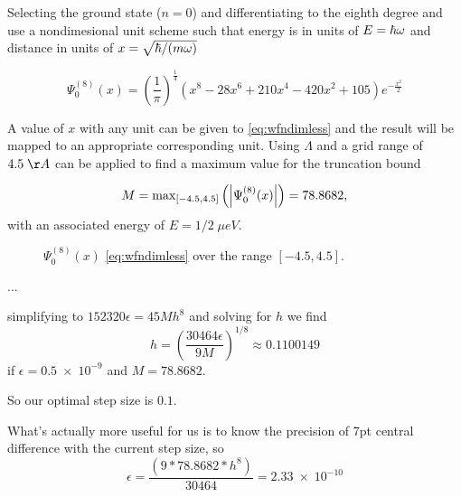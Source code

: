Selecting the ground state ($n=0$) and differentiating to the eighth degree and use a nondimesional unit scheme such that energy is in units of $\cramped{E=\hbar\omega}$ and distance in units of $\cramped{x=\sqrt{\hbar/(m\omega)}}$

\begin{equation}
\Psi_0^{(8)}(x) = \left(\frac{1}{\pi}\right)^{\frac{1}{4}}\left(x^8-28x^6+210x^4-420x^2+105\right)e^{-\frac{x^2}{2}}
\label{eq:wfndimless}
\end{equation}

A value of $x$ with any unit can be given to \cref{eq:wfndimless} and the result will be mapped to an appropriate corresponding unit. Using $\Lambda$ and a grid range of $4.5 \; \AA$ can be applied to find a maximum value for the truncation bound

\begin{equation}
M = \mathrm{max}_{[-4.5,4.5]}\left(\left\lvert \Psi_0^{(8)}(x)\right\rvert\right) = 78.8682,
\end{equation}
with an associated energy of $E = 1/2 \; \mu eV$.
\begin{figure}[htp]
\centering
\resizebox{0.5\columnwidth}{!}{}
\caption{\label{fig:mexhatproj}$\Psi_0^{(8)}(x)$ \cref{eq:wfndimless} over the range $[-4.5,4.5]$.}
\end{figure}



...

simplifying to $152320\epsilon = 45Mh^8$ and solving for $h$ we find
\begin{equation}
  h = \left(\frac{30464\epsilon}{9M}\right)^{1/8} \approx 0.1100149
\end{equation}
if $\epsilon = 0.5\;\times\;10^{-9}$ and $M = 78.8682$.

So our optimal step size is $0.1$.

What's actually more useful for us is to know the precision of 7pt central difference with the current step size, so
\begin{equation}
\epsilon = \frac{\left(9*78.8682*h^8\right)}{30464} = 2.33\;\times\;10^{-10}
\end{equation} 